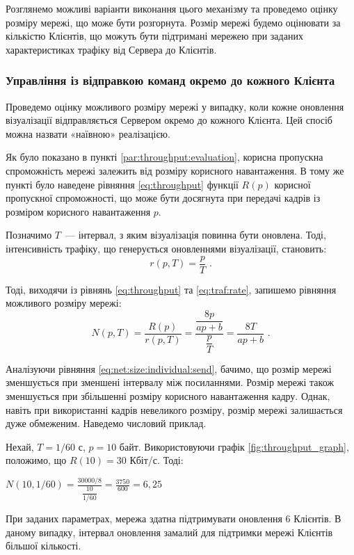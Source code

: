 \documentclass[a4paper,ukrainian,utf8,nocolumnsxix,nocolumnxxxii,nocolumnxxxi,floatsection,equationsection]{eskdtext}
\renewcommand\paragraph{\subsubsection}
\begin{document}
Розглянемо можливі варіанти виконання цього механізму та проведемо оцінку розміру мережі, що може бути розгорнута. Розмір мережі будемо оцінювати за кількістю Клієнтів, що можуть бути підтримані мережею при заданих характеристиках трафіку від Сервера до Клієнтів.

\paragraph{Управління із відправкою команд окремо до кожного Клієнта}
\label{par:individual:send}
Проведемо оцінку можливого розміру мережі у випадку, коли кожне оновлення візуалізації відправляється Сервером окремо до кожного Клієнта. Цей спосіб можна назвати «наївною» реалізацією.

Як було показано в пункті \ref{par:throughput:evaluation}, корисна пропускна спроможність мережі залежить від розміру корисного навантаження. В тому же пункті було наведене рівняння \ref{eq:throughput} функції $R(p)$ корисної пропускної спроможності, що може бути досягнута при передачі кадрів із розміром корисного навантаження $p$. 

Позначимо $T$~--- інтервал, з яким візуалізація повинна бути оновлена. Тоді, інтенсивність трафіку, що генерується оновленнями візуалізації, становить:
\begin{equation}\label{eq:traf:rate}
	r(p, T) = \frac{p}{T}  \text{ .}
\end{equation}

Тоді, виходячи із рівнянь \ref{eq:throughput} та \ref{eq:traf:rate}, запишемо рівняння можливого розміру мережі:
\begin{equation}\label{eq:net:size:individual:send}
	N(p, T) = \frac{R(p)}{r(p, T)} = \frac{\dfrac{8p}{ap+b}}{\dfrac{p}{T}} = \frac{8T}{ap + b} \text{ .}
\end{equation}

Аналізуючи рівняння \ref{eq:net:size:individual:send}, бачимо, що розмір мережі зменшується при зменшені інтервалу між посиланнями. Розмір мережі також зменшується при збільшенні розміру корисного навантаження кадру. Однак, навіть при використанні кадрів невеликого розміру, розмір мережі залишається дуже обмеженим. Наведемо числовий приклад.

Нехай, $T=1/60$ с, $p = 10$ байт. Використовуючи графік \ref{fig:throughput_graph}, положимо, що $R(10) = 30$ Кбіт/с. Тоді:

$N(10, 1/60) = \frac{30000 / 8}{\dfrac{10}{1/60}} = \frac{3750}{600} = 6,25$


При заданих параметрах, мережа здатна підтримувати оновлення 6 Клієнтів. В даному випадку, інтервал оновлення замалий для підтримки мережі Клієнтів більшої кількості.
\end{document}
